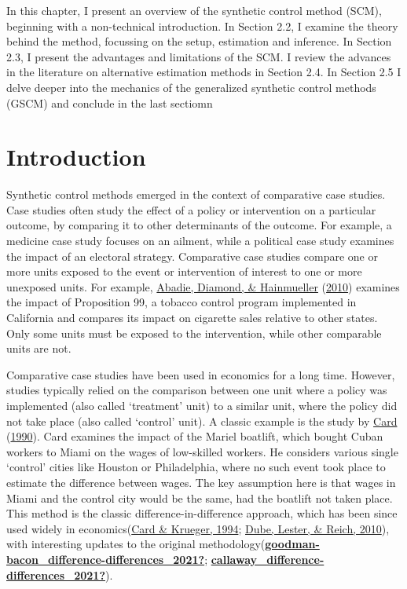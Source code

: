 \documentclass[12pt,nobind, a4paper]{reedthesis}
\begin{document}
 In this chapter, I present an overview of the synthetic control method (SCM), beginning with a non-technical introduction. In Section 2.2, I examine the theory behind the method, focussing on the setup, estimation and inference. In Section 2.3, I present the advantages and limitations of the SCM. I review the advances in the literature on alternative estimation methods in Section 2.4. In Section 2.5 I delve deeper into the mechanics of the generalized synthetic control methods (GSCM) and conclude in the last sectiomn

 \hypertarget{introduction}{%
 \section{Introduction}\label{introduction}}

 Synthetic control methods emerged in the context of comparative case studies. Case studies often study the effect of a policy or intervention on a particular outcome, by comparing it to other determinants of the outcome. For example, a medicine case study focuses on an ailment, while a political case study examines the impact of an electoral strategy. Comparative case studies compare one or more units exposed to the event or intervention of interest to one or more unexposed units. For example, \protect\hyperlink{ref-abadie_synthetic_2010}{Abadie, Diamond, \& Hainmueller} (\protect\hyperlink{ref-abadie_synthetic_2010}{2010}) examines the impact of Proposition 99, a tobacco control program implemented in California and compares its impact on cigarette sales relative to other states. Only some units must be exposed to the intervention, while other comparable units are not.
 \linebreak

 Comparative case studies have been used in economics for a long time. However, studies typically relied on the comparison between one unit where a policy was implemented (also called `treatment' unit) to a similar unit, where the policy did not take place (also called `control' unit). A classic example is the study by \protect\hyperlink{ref-card_impact_1990}{Card} (\protect\hyperlink{ref-card_impact_1990}{1990}). Card examines the impact of the Mariel boatlift, which bought Cuban workers to Miami on the wages of low-skilled workers. He considers various single `control' cities like Houston or Philadelphia, where no such event took place to estimate the difference between wages. The key assumption here is that wages in Miami and the control city would be the same, had the boatlift not taken place. This method is the classic difference-in-difference approach, which has been since used widely in economics(\protect\hyperlink{ref-card_minimum_1994}{Card \& Krueger, 1994}; \protect\hyperlink{ref-dube_minimum_2010}{Dube, Lester, \& Reich, 2010}), with interesting updates to the original methodology(\protect\hyperlink{ref-goodman-bacon_difference-differences_2021}{\textbf{goodman-bacon\_difference-differences\_2021?}}; \protect\hyperlink{ref-callaway_difference-differences_2021}{\textbf{callaway\_difference-differences\_2021?}}).
 \linebreak
\end{document}

